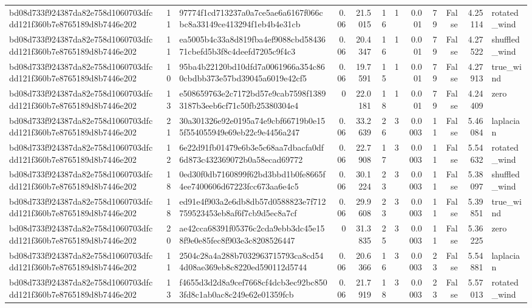 \begin{tabular}{lrlrrrrrrrrl}
bd08d733f924387da82e758d1060703dfcdd121f360b7e8765189d8b7446e202 & 11 & 97774f1cd713237a0a7ce5ae6a6167f066cbc8a33149ce413294f1eb4b4e31cb & 0.06 & 21.5015 & 16 & 1 & 0.001 & 79 & False & 4.25114 & rotated\_wind \\
bd08d733f924387da82e758d1060703dfcdd121f360b7e8765189d8b7446e202 & 11 & ea5005b4c33a8d819fba4ef9088cbd5843671cbefd5b3f8c4deefd7205c9f4c3 & 0.06 & 20.4347 & 16 & 1 & 0.001 & 79 & False & 4.27522 & shuffled\_wind \\
bd08d733f924387da82e758d1060703dfcdd121f360b7e8765189d8b7446e202 & 10 & 95ba4b22120bd10dfd7a0061966a354c860cbdbb373e57bd39045a6019e42cf5 & 0.06 & 19.7591 & 15 & 1 & 0.001 & 79 & False & 4.27913 & true\_wind \\
bd08d733f924387da82e758d1060703dfcdd121f360b7e8765189d8b7446e202 & 13 & e508659763e2c7172bd57e9cab7598f13893187b3eeb6cf71c50fb25380304e4 & 0 & 22.0181 & 18 & 1 & 0.001 & 79 & False & 4.24409 & zero \\
bd08d733f924387da82e758d1060703dfcdd121f360b7e8765189d8b7446e202 & 21 & 30a301326e92e0195a74e9cbf66719b0e155f554055949e69eb22c9e4456a247 & 0.06 & 33.2639 & 26 & 3 & 0.0003 & 11 & False & 5.46084 & laplacian \\
bd08d733f924387da82e758d1060703dfcdd121f360b7e8765189d8b7446e202 & 12 & 6e22d91fb01479e6b3e5c68aa7dbacfa0df6d873c432369072b0a58ecad69772 & 0.06 & 22.7908 & 17 & 3 & 0.0003 & 11 & False & 5.54632 & rotated\_wind \\
bd08d733f924387da82e758d1060703dfcdd121f360b7e8765189d8b7446e202 & 18 & 0ed30f0db7160899f62bd3bbd1b0fe8665f4ee7400606d67223fcc673aa6e4c5 & 0.06 & 30.1224 & 23 & 3 & 0.0003 & 11 & False & 5.38097 & shuffled\_wind \\
bd08d733f924387da82e758d1060703dfcdd121f360b7e8765189d8b7446e202 & 18 & ed91e4f903a2e6db8db57d0588823e7f712759523453eb8af6f7cb9d5ec8a7cf & 0.06 & 29.9608 & 23 & 3 & 0.0003 & 11 & False & 5.39851 & true\_wind \\
bd08d733f924387da82e758d1060703dfcdd121f360b7e8765189d8b7446e202 & 20 & ae42cca68391f05376c2cda9ebb3dc45e158f9e0e85fec8f903e3c8208526447 & 0 & 31.3835 & 25 & 3 & 0.0003 & 11 & False & 5.36225 & zero \\
bd08d733f924387da82e758d1060703dfcdd121f360b7e8765189d8b7446e202 & 11 & 2504c28a4a288b7032963715793ca8cd544d08ae369eb8c8220ed590112d5744 & 0.06 & 20.6366 & 16 & 3 & 0.0003 & 23 & False & 5.54881 & laplacian \\
bd08d733f924387da82e758d1060703dfcdd121f360b7e8765189d8b7446e202 & 13 & f4655d3d2d8a9cef7668cf4dcb3ec92bc8503fd8c1ab0ac8c249e62e01359fcb & 0.06 & 21.7919 & 18 & 3 & 0.0003 & 23 & False & 5.57013 & rotated\_wind \\

\end{tabular}
